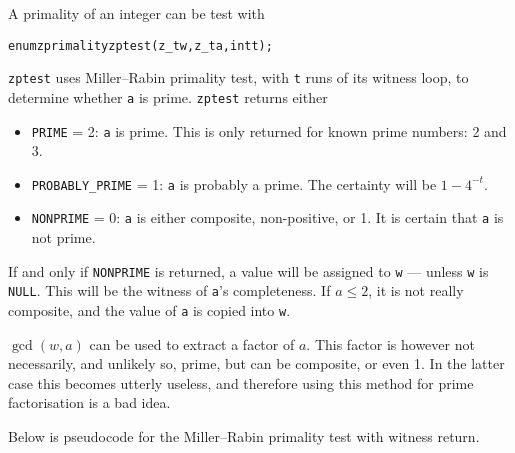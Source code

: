 A primality of an integer can be test with

\begin{alltt}
   enum zprimality zptest(z_t w, z_t a, int t);
\end{alltt}

\noindent
{\tt zptest} uses Miller–Rabin primality test,
with {\tt t} runs of its witness loop, to
determine whether {\tt a} is prime. {\tt zptest}
returns either

\begin{itemize}
\item {\tt PRIME} = 2:
{\tt a} is prime. This is only returned for
known prime numbers: 2 and 3.

\item {\tt PROBABLY\_PRIME} = 1:
{\tt a} is probably a prime. The certainty
will be $1 - 4^{-t}$.

\item {\tt NONPRIME} = 0:
{\tt a} is either composite, non-positive, or 1.
It is certain that {\tt a} is not prime.
\end{itemize}

If and only if {\tt NONPRIME} is returned, a
value will be assigned to {\tt w} — unless
{\tt w} is {\tt NULL}. This will be the witness
of {\tt a}'s completeness. If $a \le 2$, it
is not really composite, and the value of
{\tt a} is copied into {\tt w}.

$\gcd(w, a)$ can be used to extract a factor
of $a$. This factor is however not necessarily,
and unlikely so, prime, but can be composite,
or even 1. In the latter case this becomes
utterly useless, and therefore using this
method for prime factorisation is a bad idea.

Below is pseudocode for the Miller–Rabin primality
test with witness return.

